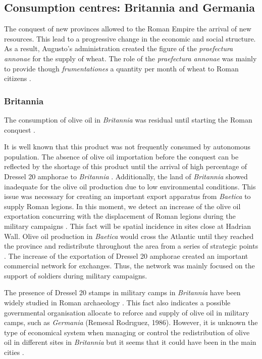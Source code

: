 \documentclass[review]{elsarticle}
\begin{document}
\subsection{Consumption centres: Britannia and Germania}

The conquest of new provinces allowed to the Roman Empire the arrival of new resources. This lead to a progressive change in the economic and social structure. As a result, Augusto's administration created the figure of the \textit{praefectura annonae} for the supply of wheat. The role of the \textit{praefectura annonae} was mainly to provide though \textit{frumentationes} a quantity per month of wheat to Roman citizens \citep{remesal_annona_1986,remesal_concierto}. 

\subsubsection{Britannia}

The consumption of olive oil in \textit{Britannia} was residual until starting the Roman conquest \citep{funari_corpus_1996,
carreras_abastecimiento_2003}.

It is well known that this product was not frequently consumed by autonomous population. The absence of olive oil importation before the conquest can be reflected by the shortage of this product until the arrival of high percentage of Dressel 20 amphorae to \textit{Britannia} \citep[ 1]{carreras_britannia_1998}. Additionally, the land of \textit{Britannia} showed inadequate for the olive oil production due to low environmental conditions. This issue was necessary for creating an important export apparatus from \textit{Baetica} to supply Roman legions.
In this moment, we detect an increase of the olive oil exportation concurring with the displacement of Roman legions during the military campaigns \citep[161]{monfort_britanniaen_1998}. This fact will be spatial incidence in sites close at Hadrian Wall.  
Olive oil production in \textit{Baetica} would cross the Atlantic until they reached the province and redistribute throughout the area from a series of strategic points \citep{carreras_atlantic_2012}. The increase of the exportation of Dressel 20 amphorae created an important commercial network for exchanges. Thus, the network was mainly focused on the support of soldiers during military campaigns. 

The presence of Dressel 20 stamps in military camps in \textit{Britannia} have been widely studied in Roman archaeology \citep{carreras_britannia_1998}. This fact also indicates a possible governmental organisation allocate to reforce and supply of olive oil in military camps, such as \textit{Germania} (Remesal Rodrıguez, 1986). However, it is unknown the type of economical system when managing or control the redistribution of olive oil in different sites in \textit{Britannia} but it seems that it could have been in the main cities \citep[45]{funari_economic_2005}.
\end{document}
